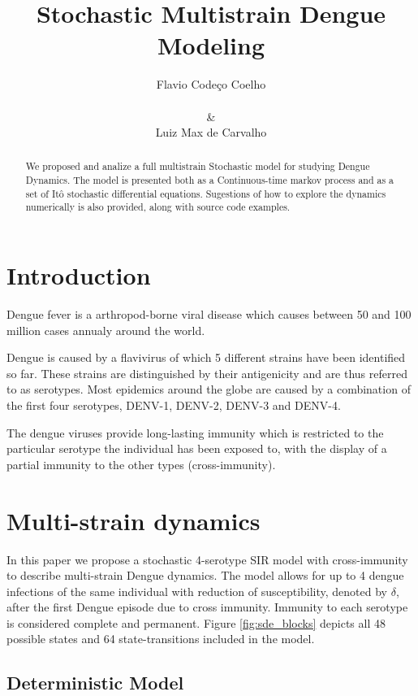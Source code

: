 \documentclass[12pt]{article}
\title{
Stochastic Multistrain Dengue Modeling
}
\author{
Flavio Code\c{c}o Coelho \\
\\
\& \\
Luiz Max de Carvalho \\
}
\date{}
\begin{document}
   
\maketitle
\begin{abstract}
 We proposed and analize a full multistrain Stochastic model for studying 
Dengue Dynamics. The model is presented both as a Continuous-time markov 
process and as a set of Itô stochastic differential equations. Sugestions of 
how to explore the dynamics numerically is also provided, along with source 
code examples. 
\end{abstract}

\section*{Introduction}

Dengue fever is a arthropod-borne viral disease which causes between 50 and 
100 million cases annualy around the world.

Dengue is caused by a flavivirus of which 5 different strains have been 
identified so far. These strains are distinguished by their antigenicity and 
are thus referred to as serotypes. Most epidemics around the globe are caused 
by a combination of the first four serotypes, DENV-1, DENV-2, DENV-3 and DENV-4.

The dengue viruses provide long-lasting immunity which is restricted to the 
particular serotype the individual has been exposed to, with the display of a 
partial immunity to the other types (cross-immunity).


\section*{Multi-strain dynamics}

In this paper we propose a stochastic 4-serotype SIR model with 
cross-immunity to describe multi-strain Dengue dynamics. 
The model allows for up to 4 dengue infections of the same individual
with reduction of susceptibility, denoted by $\delta$, after the first Dengue 
episode due to cross immunity. 
Immunity to each serotype is considered complete and permanent. 
Figure \ref{fig:sde_blocks} depicts all 48 possible states and 64 
state-transitions included in the model.

\subsection*{Deterministic Model}
\end{document}
